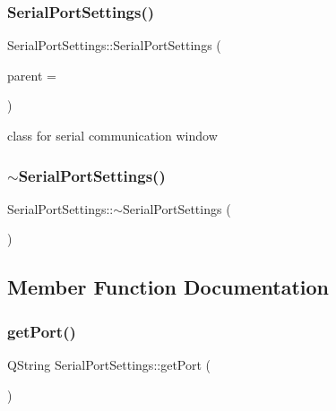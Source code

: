 \subsubsection{\texorpdfstring{Serial\+Port\+Settings()}{SerialPortSettings()}}
{\footnotesize\ttfamily Serial\+Port\+Settings\+::\+Serial\+Port\+Settings (\begin{DoxyParamCaption}\item[{Q\+Widget $\ast$}]{parent = {} }\end{DoxyParamCaption})\hspace{0.3cm}{\ttfamily [explicit]}}

class for serial communication window \mbox{\label{class_serial_port_settings_a4a9fcf3027d619aaef512aeb9f5a2b8f}} 
\subsubsection{\texorpdfstring{$\sim$\+Serial\+Port\+Settings()}{~SerialPortSettings()}}
{\footnotesize\ttfamily Serial\+Port\+Settings\+::$\sim$\+Serial\+Port\+Settings (\begin{DoxyParamCaption}{ }\end{DoxyParamCaption})}



\subsection{Member Function Documentation}
\mbox{\label{class_serial_port_settings_aa1aa401b8b0b394b182bf3e0b8cf146b}} 
\subsubsection{\texorpdfstring{get\+Port()}{getPort()}}
{\footnotesize\ttfamily Q\+String Serial\+Port\+Settings\+::get\+Port (\begin{DoxyParamCaption}{ }\end{DoxyParamCaption})}



